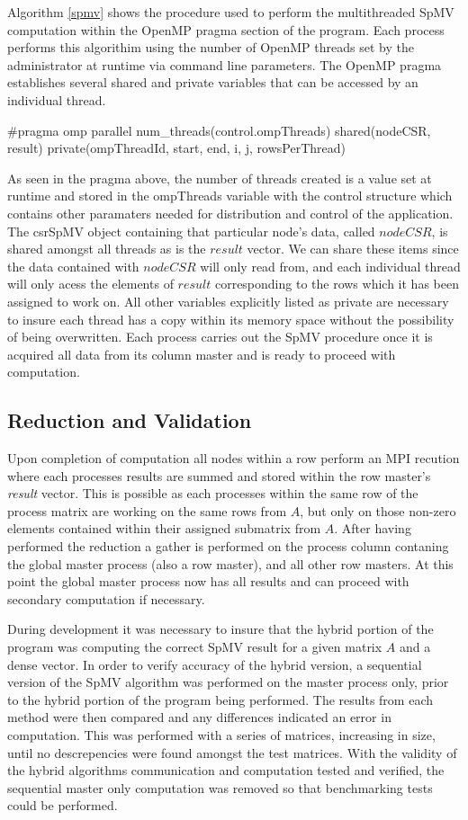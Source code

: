 Algorithm \ref{spmv} shows the procedure used to perform the multithreaded SpMV computation within the OpenMP pragma section of the program. Each process performs this algorithim using the number of OpenMP threads set by the administrator at runtime via command line parameters. 
The OpenMP pragma establishes several shared and private variables that can be accessed by an individual thread. 

\bigskip
\#pragma omp parallel num\_threads(control.ompThreads) shared(nodeCSR, result) private(ompThreadId, start, end, i, j, rowsPerThread)
\bigskip

As seen in the pragma above, the number of threads created is a value set at runtime and stored in the ompThreads variable with the control structure which contains other paramaters needed for distribution and control of the application.
The csrSpMV object containing that particular node's data, called $nodeCSR$, is shared amongst all threads as is the $result$ vector.
We can share these items since the data contained with $nodeCSR$ will only read from, and each individual thread will only acess the elements of $result$ corresponding to the rows which it has been assigned to work on.
All other variables explicitly listed as private are necessary to insure each thread has a copy within its memory space without the possibility of being overwritten.
Each process carries out the SpMV procedure once it is acquired all data from its column master and is ready to proceed with computation. 


\subsection{Reduction and Validation}

Upon completion of computation all nodes within a row perform an MPI recution where each processes results are summed and stored within the row master's \emph{result} vector.
This is possible as each processes within the same row of the process matrix are working on the same rows from $A$, but only on those non-zero elements contained within their assigned submatrix from $A$. 
After having performed the reduction a gather is performed on the process column contaning the global master process (also a row master), and all other row masters.
At this point the global master process now has all results and can proceed with secondary computation if necessary. 

During development it was necessary to insure that the hybrid portion of the program was computing the correct SpMV result for a given matrix $A$ and a dense vector.
In order to verify accuracy of the hybrid version, a sequential version of the SpMV algorithm was performed on the master process only, prior to the hybrid portion of the program being performed.
The results from each method were then compared and any differences indicated an error in computation.
This was performed with a series of matrices, increasing in size, until no descrepencies were found amongst the test matrices. 
With the validity of the hybrid algorithms communication and computation tested and verified, the sequential master only computation was removed so that benchmarking tests could be performed. 

